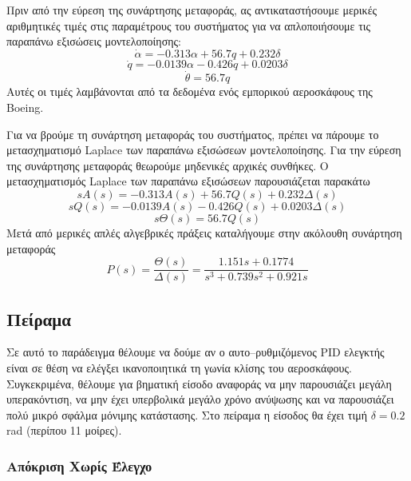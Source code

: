 Πριν από την εύρεση της συνάρτησης μεταφοράς, ας αντικαταστήσουμε μερικές αριθμητικές τιμές στις παραμέτρους του συστήματος για να απλοποιήσουμε τις παραπάνω εξισώσεις μοντελοποίησης:
\begin{equation}
\dot{\alpha} = -0.313\alpha + 56.7q + 0.232\delta
\end{equation}
\begin{equation}
\dot{q} = -0.0139\alpha - 0.426q + 0.0203\delta
\end{equation}
\begin{equation}
\dot{\theta} = 56.7q
\end{equation}
Αυτές οι τιμές λαμβάνονται από τα δεδομένα ενός εμπορικού αεροσκάφους της Boeing.

Για να βρούμε τη συνάρτηση μεταφοράς του συστήματος, πρέπει να πάρουμε το μετασχηματισμό Laplace των παραπάνω εξισώσεων μοντελοποίησης. Για την εύρεση της συνάρτησης μεταφοράς θεωρούμε μηδενικές αρχικές συνθήκες. Ο μετασχηματισμός Laplace των παραπάνω εξισώσεων παρουσιάζεται παρακάτω
\begin{equation}
sA(s)=-0.313A(s)+56.7Q(s)+0.232\Delta(s)
\end{equation}
\begin{equation}
sQ(s)=-0.0139A(s)-0.426Q(s)+0.0203\Delta(s)
\end{equation}
\begin{equation}
s\Theta(s) = 56.7Q(s)
\end{equation}
Μετά από μερικές απλές αλγεβρικές πράξεις καταλήγουμε στην ακόλουθη συνάρτηση μεταφοράς
\begin{equation}
P(s) = \frac{\Theta(s)}{\Delta(s)} = \frac{1.151s+0.1774}{s^3+0.739s^2+0.921s}
\label{eq:aircraft_tf}
\end{equation}

\subsection{Πείραμα}

Σε αυτό το παράδειγμα θέλουμε να δούμε αν ο αυτο--ρυθμιζόμενος PID ελεγκτής είναι σε θέση να ελέγξει ικανοποιητικά τη γωνία κλίσης του αεροσκάφους. Συγκεκριμένα, θέλουμε για βηματική είσοδο αναφοράς να μην παρουσιάζει μεγάλη υπερακόντιση, να μην έχει υπερβολικά μεγάλο χρόνο ανύψωσης και να παρουσιάζει πολύ μικρό σφάλμα μόνιμης κατάστασης. Στο πείραμα η είσοδος θα έχει τιμή $\delta=0.2$ rad (περίπου 11 μοίρες).

\subsubsection{Απόκριση Χωρίς Έλεγχο}

